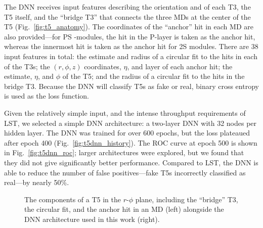 The DNN receives input features describing the orientation and \pt of each T3, the T5 itself, and the ``bridge T3'' that connects the three MDs at the center of the T5 (Fig.~\ref{fig:t5_anatomy}). 
The coordinates of the ``anchor'' hit in each MD are also provided---for PS \pt-modules, the hit in the P-layer is taken as the anchor hit, whereas the innermost hit is taken as the anchor hit for 2S modules. 
There are 38 input features in total: the \pt estimate and radius of a circular fit to the hits in each of the T3s; 
the $(r, \phi, z)$ coordinates, $\eta$, and layer of each anchor hit; 
the \pt estimate, $\eta$, and $\phi$ of the T5; 
and the radius of a circular fit to the hits in the bridge T3. 
Because the DNN will classify T5s as fake or real, binary cross entropy is used as the loss function. 

Given the relatively simple input, and the intense throughput requirements of LST, we selected a simple DNN architecture: a two-layer DNN with 32 nodes per hidden layer. 
The DNN was trained for over 600 epochs, but the loss plateaued after epoch 400 (Fig.~\ref{fig:t5dnn_history}). 
The ROC curve at epoch 500 is shown in Fig.~\ref{fig:t5dnn_roc}; larger architectures were explored, but we found that they did not give significantly better performance. 
Compared to LST, the DNN is able to reduce the number of false positives---fake T5s incorrectly classified as real---by nearly 50\%. 

\begin{figure}[!htb]
    \centering
    \qquad
    \caption[The components of a T5 and the DNN architecture]{
        The components of a T5 in the $r$-$\phi$ plane, including the ``bridge'' T3, the circular fit, and the anchor hit in an MD (left) alongside the DNN architecture used in this work (right). 
    }
\end{figure}

